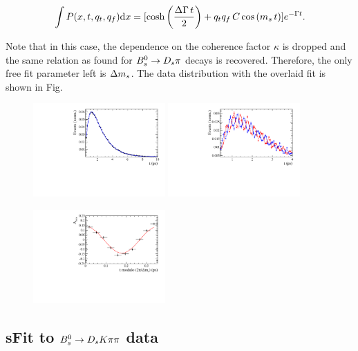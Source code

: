 \begin{equation}
\int P(x,t,q_t,q_f) \text d x = [\text{cosh} \left( \frac{\Delta \Gamma \, t}{2}\right) + q_t q_f \, C \, \text{cos} \left( m_s \, t \right)] e^{- \Gamma t}.
\end{equation}

Note that in this case, the dependence on the coherence factor $\kappa$ is dropped and the same relation as found for ${{B}^0_{s}}\rightarrow{\ensuremath{{D}_{s}}}{\ensuremath{\pi}}$ decays is recovered. 
Therefore, the only free fit parameter left is ${\Delta m_{{s}}}$. The data distribution with the overlaid fit is shown in Fig. 

\begin{figure}[h]
	\centering
		\includegraphics[width=0.45\textwidth, height = !]{figs/timeFit/norm_taggingCalib/h_t.pdf} 
		\includegraphics[width=0.45\textwidth, height = !]{figs/timeFit/norm_taggingCalib/h_t_mixed.pdf} 

		\includegraphics[width=0.45\textwidth, height = !]{figs/timeFit/norm_taggingCalib/h_asym.pdf} 		
		\caption{} 		
\end{figure}	



\clearpage
\subsection{sFit to ${{B}^0_{s}}\rightarrow{\ensuremath{{D}_{s}}}{\ensuremath{K}}{\ensuremath{\pi}}{\ensuremath{\pi}}$ data}

